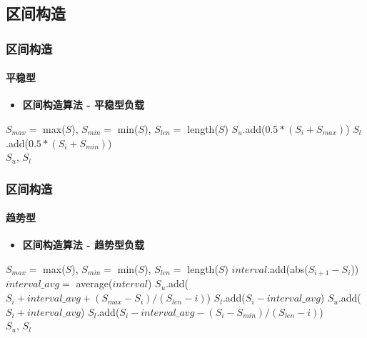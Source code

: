 \subsection{区间构造}

\begin{frame}
\frametitle{区间构造}
\framesubtitle{平稳型}
\begin{itemize}
    \item \textbf{区间构造算法 - 平稳型负载}
\end{itemize}
\begin{algorithmic}[1]
    \State $S_{max} =$ max($S$), $S_{min} =$ min($S$), $S_{len} =$ length($S$)
        \State $S_u$.add($0.5*(S_i + S_{max})$) 
        \State $S_l$.add($0.5*(S_i + S_{min})$) 
      \EndFor
    \EndIf \\
    \Return $S_u$, $S_l$
\end{algorithmic}
\end{frame}

\begin{frame}[allowframebreaks]
\frametitle{区间构造}
\framesubtitle{趋势型}
\begin{itemize}
    \item \textbf{区间构造算法 - 趋势型负载}
\end{itemize}
\begin{algorithmic}[1]
  \State $S_{max} =$ max($S$), $S_{min} =$ min($S$), $S_{len} =$ length($S$)
     
      \State $interval$.add(abs($S_{i+1} - S_i$))
    \State $interval\_avg =$ average($interval$)
    \EndFor
    \framebreak
     
        \State $S_u$.add($S_i + interval\_avg + (S_{max} - S_i)/(S_{len} - i)$)
        \State $S_l$.add($S_i - interval\_avg$)
      \EndIf
       
        \State $S_u$.add($S_i + interval\_avg $)
        \State $S_l$.add($S_i - interval\_avg - (S_i - S_{min})/(S_{len} - i)$)
      \EndIf
    \EndFor
  \EndIf \\
  \Return $S_u$, $S_l$
\end{algorithmic}
\bigskip
\end{frame}

